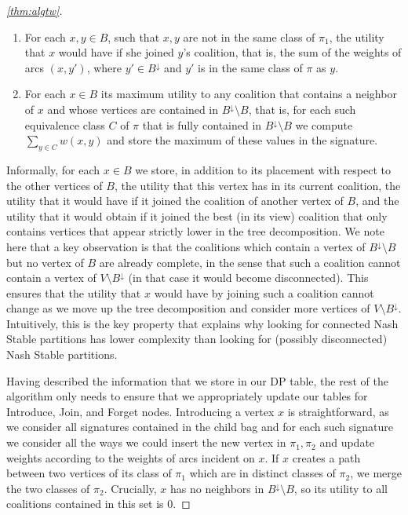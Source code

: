 \documentclass[letterpaper,USenglish,cleveref, autoref, thm-restate]{lipics-v2021}
\begin{document}
\begin{proof}[\cref{thm:algtw}]
\begin{enumerate}
\item For each $x,y\in B$, such that $x,y$ are not in the same class of
$\pi_1$, the utility that $x$ would have if she joined $y$'s coalition, that
is, the sum of the weights of arcs $(x,y')$, where $y'\in B^{\downarrow}$ and
$y'$ is in the same class of $\pi$ as $y$.

\item For each $x\in B$ its maximum utility to any coalition that contains a
neighbor of $x$ and whose vertices are contained in $B^{\downarrow}\setminus
B$, that is, for each such equivalence class $C$ of $\pi$ that is fully
contained in $B^{\downarrow}\setminus B$ we compute $\sum_{y\in C} w(x,y)$ and
store the maximum of these values in the signature.

\end{enumerate} 

Informally, for each $x\in B$ we store, in addition to its placement with
respect to the other vertices of $B$, the utility that this vertex has in its
current coalition, the utility that it would have if it joined the coalition of
another vertex of $B$, and the utility that it would obtain if it joined the
best (in its view) coalition that only contains vertices that appear strictly
lower in the tree decomposition. We note here that a key observation is that
the coalitions which contain a vertex of $B^{\downarrow}\setminus B$ but no
vertex of $B$ are already complete, in the sense that such a coalition cannot
contain a vertex of $V\setminus B^{\downarrow}$ (in that case it would become
disconnected). This ensures that the utility that $x$ would have by joining
such a coalition cannot change as we move up the tree decomposition and
consider more vertices of $V\setminus B^{\downarrow}$. Intuitively, this is the
key property that explains why looking for connected Nash Stable partitions has
lower complexity than looking for (possibly disconnected) Nash Stable
partitions.

Having described the information that we store in our DP table, the rest of the
algorithm only needs to ensure that we appropriately update our tables for
Introduce, Join, and Forget nodes.  Introducing a vertex $x$ is
straightforward, as we consider all signatures contained in the child bag and
for each such signature we consider all the ways we could insert the new vertex
in $\pi_1, \pi_2$ and update weights according to the weights of arcs incident
on $x$. If $x$ creates a path between two vertices of its class of $\pi_1$
which are in distinct classes of $\pi_2$, we merge the two classes of $\pi_2$.
Crucially, $x$ has no neighbors in $B^{\downarrow}\setminus B$, so its utility
to all coalitions contained in this set is $0$. 


\end{proof}
\end{document}
